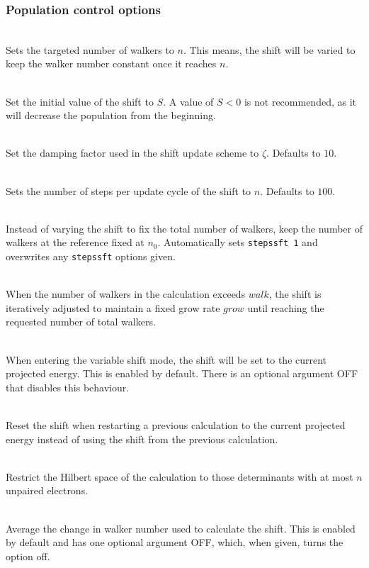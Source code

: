 \documentclass[a4paper,notitlepage]{scrreprt}
\newcommand\codeitem[1]{\needspace{1.5\baselineskip}\item[\textnormal{\ttfamily #1 \nopagebreak}] \hfill \\ \nopagebreak}
\begin{document}
  \subsubsection{Population control options}
  \begin{description}
    \codeitem{totalwalkers $n$}
    Sets the targeted number of walkers to $n$. This means, the shift will be
    varied to keep the walker number constant once it reaches $n$.
    \codeitem{diagshift $S$}
    Set the initial value of the shift to $S$. A value of $S<0$ is not
    recommended, as it will decrease the population from the beginning.
    \codeitem{shiftdamp $\zeta$}
    Set the damping factor used in the shift update scheme to
    $\zeta$. Defaults to $10$.
    \codeitem{stepssft $n$}
    Sets the number of steps per update cycle of the shift to $n$. Defaults to
    $100$.
    \codeitem{fixed-n0 $n_0$}
    Instead of varying the shift to fix the total number of walkers, keep the
    number of walkers at the reference fixed at $n_0$. Automatically sets
    \texttt{stepssft 1} and overwrites any \texttt{stepssft} options given.
    \codeitem{targetgrowrate $grow$ $walks$}
    When the number of walkers in the calculation exceeds $walk$, the shift is
    iteratively adjusted to maintain a fixed grow rate $grow$ until reaching
    the requested number of total walkers.
    \codeitem{jump-shift OFF}
    When entering the variable shift mode, the shift will be set to the
    current projected energy. This is enabled by default. There is an optional
    argument OFF that disables this behaviour.
    \codeitem{pops-jump-shift}
    Reset the shift when restarting a previous calculation to the current
    projected energy instead of using the shift from the previous
    calculation.
    \codeitem{trunc-nopen $n$}
    Restrict the Hilbert space of the calculation to those determinants with
    at most $n$ unpaired electrons.
    \codeitem{avgrowthrate OFF}
    Average the change in walker number used to calculate the shift. This is
    enabled by default and has one optional argument OFF, which, when given,
    turns the option off.
  \end{description}
\end{document}
